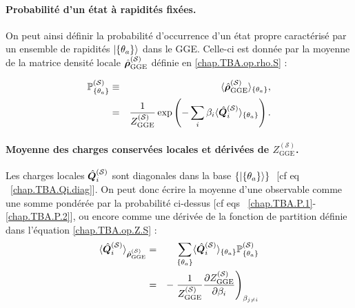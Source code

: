 \paragraph{Probabilité d’un état à rapidités fixées.}

On peut ainsi définir la probabilité d’occurrence d’un état propre caractérisé par un ensemble de rapidités $\ket{\{\theta_a\}}$ dans le \gls{GGE}. Celle-ci est donnée par la moyenne de la matrice densité locale $\hat{\bm{\rho}}^{(\mathcal{S})}_{\mathrm{GGE}}$ définie en \eqref{chap.TBA.op.rho.S} :

\begin{eqnarray}
	\mathbb{P}^{(\mathcal{S})}_{\{ \theta_a \}}  & \equiv &  \langle \hat{\bm{\rho}}^{(\mathcal{S})}_{\mathrm{GGE}} \rangle_{\{\theta_a \}}, \label{chap.TBA.P.1}\\
	& = & 
	\frac{1}{Z^{(\mathcal{S})}_{\mathrm{GGE}}} \exp \left (- \sum_i \beta_i \langle \hat{\bm{Q}}_i^{(\mathcal{S})} \rangle_{\{\theta_a \}} \right ) \label{chap.TBA.P.2}.
\end{eqnarray}

\paragraph{Moyenne des charges conservées locales et dérivées de $Z^{(\mathcal{S})}_{\mathrm{GGE}}$.} Les charges locales $\hat{\bm{Q}}_i^{(\mathcal{S})}$ sont diagonales dans la base \( \{ \ket{\{\theta_a \}} \}  \) [cf eq~ ~\eqref{chap.TBA.Qi.diag}]. 
On peut donc  écrire la moyenne d’une observable comme une somme pondérée par la probabilité ci-dessus [cf eqs ~\eqref{chap.TBA.P.1}-\eqref{chap.TBA.P.2}], ou encore comme une dérivée de la fonction de partition définie dans l'équation \eqref{chap.TBA.op.Z.S} :
\begin{eqnarray}
	\langle \hat{\bm{Q}}_i^{(\mathcal{S})} \rangle_{\hat{\bm{\rho}}^{(\mathcal{S})}_{\mathrm{GGE}}} &= & \sum_{\{ \theta_a\}} \langle \hat{\bm{Q}}_i^{(\mathcal{S})} \rangle_{\{\theta_a \}} \mathbb{P}^{(\mathcal{S})}_{\{ \theta_a \}} \label{chap.TBA.moy.1}\\
	 & = &  -\left. \frac{1}{Z^{(\mathcal{S})}_{\mathrm{GGE}}} \frac{\partial Z^{(\mathcal{S})}_{\mathrm{GGE}}}{\partial \beta_i} \right )_{\beta_{j \neq i }}	 \label{chap.TBA.moy.2}
\end{eqnarray}


